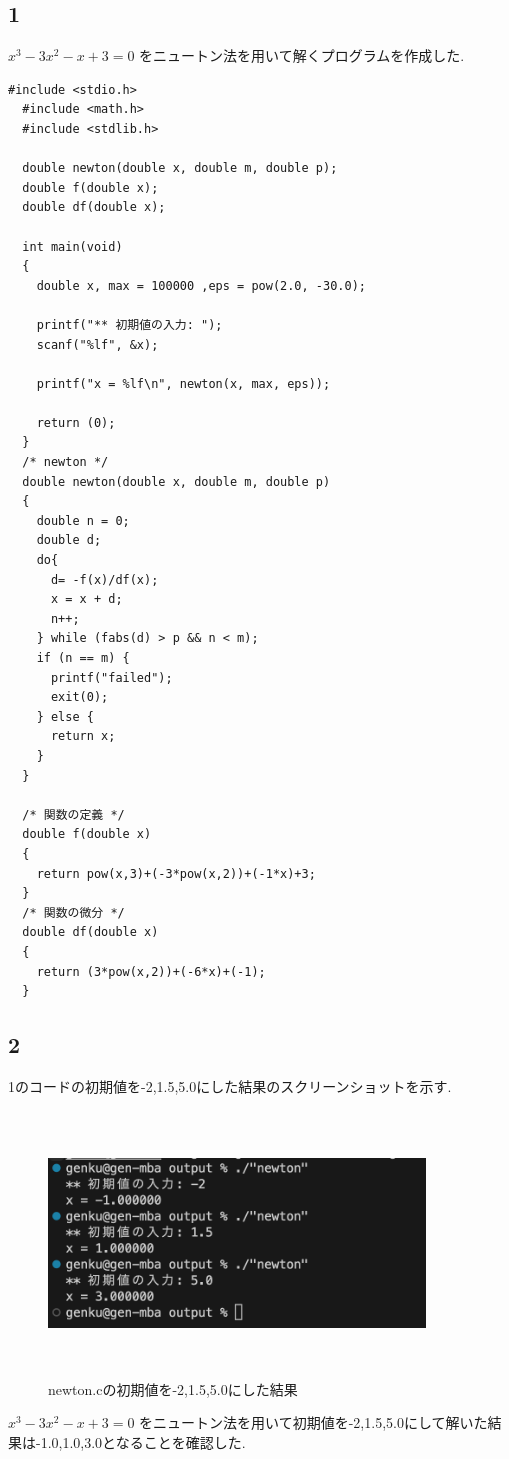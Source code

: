 \documentclass[a4j,10pt,dvipdfmx]{jarticle}
\begin{document}
\subsection{1}
$x^{3} - 3x^{2} - x + 3 = 0$ をニュートン法を用いて解くプログラムを作成した.
\begin{lstlisting}[label=prm1, caption=newton.c]
  #include <stdio.h>
  #include <math.h>
  #include <stdlib.h>
  
  double newton(double x, double m, double p);
  double f(double x);
  double df(double x);
  
  int main(void)
  {
    double x, max = 100000 ,eps = pow(2.0, -30.0);
  
    printf("** 初期値の入力: ");
    scanf("%lf", &x);
  
    printf("x = %lf\n", newton(x, max, eps));
  
    return (0);
  }
  /* newton */
  double newton(double x, double m, double p)
  {
    double n = 0;
    double d;
    do{
      d= -f(x)/df(x);
      x = x + d;
      n++;
    } while (fabs(d) > p && n < m);
    if (n == m) {
      printf("failed");
      exit(0);
    } else {
      return x;
    }
  }
  
  /* 関数の定義 */
  double f(double x)
  {
    return pow(x,3)+(-3*pow(x,2))+(-1*x)+3;
  }
  /* 関数の微分 */
  double df(double x)
  {
    return (3*pow(x,2))+(-6*x)+(-1);
  }  
\end{lstlisting}
\subsection{2}
1のコードの初期値を-2,1.5,5.0にした結果のスクリーンショットを示す.
\begin{figure}[H]
  \begin{center}
  \includegraphics[height=7cm,width=10cm]{screen716.png}
  \caption{newton.cの初期値を-2,1.5,5.0にした結果}
\end{center}
\end{figure}
$x^{3} - 3x^{2} - x + 3 = 0$ をニュートン法を用いて初期値を-2,1.5,5.0にして解いた結果は-1.0,1.0,3.0となることを確認した.
\end{document}
